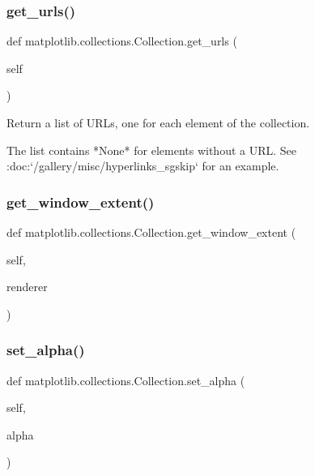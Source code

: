 \subsubsection{\texorpdfstring{get\+\_\+urls()}{get\_urls()}}
{\footnotesize\ttfamily def matplotlib.\+collections.\+Collection.\+get\+\_\+urls (\begin{DoxyParamCaption}\item[{}]{self }\end{DoxyParamCaption})}

\begin{DoxyVerb}Return a list of URLs, one for each element of the collection.

The list contains *None* for elements without a URL. See
:doc:`/gallery/misc/hyperlinks_sgskip` for an example.
\end{DoxyVerb}
 \mbox{\label{classmatplotlib_1_1collections_1_1Collection_affa009f06d8359b1389cc42333346f85}} 
\subsubsection{\texorpdfstring{get\+\_\+window\+\_\+extent()}{get\_window\_extent()}}
{\footnotesize\ttfamily def matplotlib.\+collections.\+Collection.\+get\+\_\+window\+\_\+extent (\begin{DoxyParamCaption}\item[{}]{self,  }\item[{}]{renderer }\end{DoxyParamCaption})}

\mbox{\label{classmatplotlib_1_1collections_1_1Collection_a13d51bba55c0e46154330e7559cea9e5}} 
\subsubsection{\texorpdfstring{set\+\_\+alpha()}{set\_alpha()}}
{\footnotesize\ttfamily def matplotlib.\+collections.\+Collection.\+set\+\_\+alpha (\begin{DoxyParamCaption}\item[{}]{self,  }\item[{}]{alpha }\end{DoxyParamCaption})}

